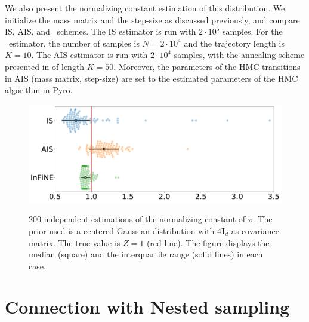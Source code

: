 \documentclass{article}
\begin{document}
We also present the normalizing constant estimation of this distribution. We initialize the mass matrix and the step-size as discussed previously, and compare IS, AIS, and \InFiNE\ schemes.
The IS estimator is run with $2\cdot 10^5$ samples.
For the \IFIS\ estimator, the number of samples is $N = 2\cdot 10^4$ and the trajectory length is $K=10$. The AIS estimator is run with $2\cdot 10^4$ samples, with the annealing scheme presented in \citep[Section 6.2]{grosse2015sandwiching} of length $K=50$. Moreover, the parameters of the HMC transitions in AIS (mass matrix, step-size) are set to the estimated parameters of the HMC algorithm in Pyro. 
\begin{figure}[!ht]
    \centering
    \includegraphics[width=0.7 \linewidth]{pics/funnel.pdf}
    \label{fig:funnel_estimation}
    \caption{200 independent estimations of the normalizing constant of $\pi$. The prior used is a centered Gaussian distribution with $4\mathbf{I}_d$ as covariance matrix. The true value is $Z=1$ (red line). The figure displays the median (square) and the interquartile range (solid lines) in each case.}
\end{figure}



\section{Connection with Nested sampling}

\end{document}
